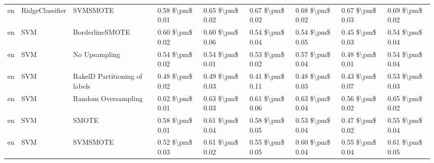 \begin{tabular}{lllllllll}
      en &                 RidgeClassifier &                      SVMSMOTE & 0.58 \$\textbackslash pm\$ 0.01 &           0.65 \$\textbackslash pm\$ 0.02 &       0.67 \$\textbackslash pm\$ 0.02 &        0.68 \$\textbackslash pm\$ 0.02 &                         0.67 \$\textbackslash pm\$ 0.03 &     0.69 \$\textbackslash pm\$ 0.02 \\
      en &                             SVM &               BorderlineSMOTE & 0.60 \$\textbackslash pm\$ 0.02 &           0.60 \$\textbackslash pm\$ 0.06 &       0.54 \$\textbackslash pm\$ 0.04 &        0.54 \$\textbackslash pm\$ 0.05 &                         0.45 \$\textbackslash pm\$ 0.03 &     0.54 \$\textbackslash pm\$ 0.04 \\
      en &                             SVM &                 No Upsampling & 0.54 \$\textbackslash pm\$ 0.02 &           0.54 \$\textbackslash pm\$ 0.01 &       0.53 \$\textbackslash pm\$ 0.02 &        0.57 \$\textbackslash pm\$ 0.04 &                         0.48 \$\textbackslash pm\$ 0.01 &     0.54 \$\textbackslash pm\$ 0.04 \\
      en &                             SVM & RakelD Partitioning of labels & 0.48 \$\textbackslash pm\$ 0.02 &           0.49 \$\textbackslash pm\$ 0.03 &       0.41 \$\textbackslash pm\$ 0.11 &        0.48 \$\textbackslash pm\$ 0.03 &                         0.43 \$\textbackslash pm\$ 0.07 &     0.53 \$\textbackslash pm\$ 0.03 \\
      en &                             SVM &           Random Oversampling & 0.62 \$\textbackslash pm\$ 0.01 &           0.63 \$\textbackslash pm\$ 0.03 &       0.61 \$\textbackslash pm\$ 0.06 &        0.63 \$\textbackslash pm\$ 0.04 &                         0.56 \$\textbackslash pm\$ 0.02 &     0.65 \$\textbackslash pm\$ 0.02 \\
      en &                             SVM &                         SMOTE & 0.58 \$\textbackslash pm\$ 0.01 &           0.61 \$\textbackslash pm\$ 0.04 &       0.58 \$\textbackslash pm\$ 0.05 &        0.53 \$\textbackslash pm\$ 0.04 &                         0.47 \$\textbackslash pm\$ 0.02 &     0.55 \$\textbackslash pm\$ 0.04 \\
      en &                             SVM &                      SVMSMOTE & 0.52 \$\textbackslash pm\$ 0.03 &           0.61 \$\textbackslash pm\$ 0.02 &       0.55 \$\textbackslash pm\$ 0.05 &        0.60 \$\textbackslash pm\$ 0.04 &                         0.55 \$\textbackslash pm\$ 0.04 &     0.61 \$\textbackslash pm\$ 0.05 \\

\end{tabular}
